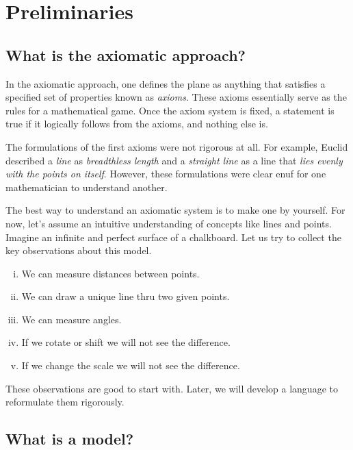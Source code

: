 \chapter{Preliminaries}\label{chap:metr}


\section{What is the axiomatic approach?}
\label{preaxioms}

In the axiomatic approach, one defines the plane as anything that satisfies a specified set of properties known as {}\emph{axioms}.
These axioms essentially serve as the rules for a mathematical game.
Once the axiom system is fixed, a statement is true if it logically follows from the axioms, and nothing else is.

The formulations of the first axioms were not rigorous at all.
For example, Euclid described a {}\emph{line} as \textit{breadthless length}
and a {}\emph{straight line} as a line that \textit{lies evenly with the points on itself}.
However, these formulations were clear enuf for one mathematician to understand another.

The best way to understand an axiomatic system
is to make one by yourself.
For now, let's assume an intuitive understanding of concepts like lines and points.
Imagine an infinite and perfect surface of a chalkboard. 
Let us try to collect the key observations about this model.

\begin{enumerate}[(i)]
 \item\label{preaxiomI} We can measure distances between points.
 \item\label{preaxiomII} We can draw a unique line thru two given points.
 \item\label{preaxiomIII} We can measure angles.
 \item\label{preaxiomIV} If we rotate or shift we will not see the difference.
 \item\label{preaxiomV} If we change the scale we will not see the difference.
\end{enumerate}
These observations are good to start with.
Later, we will develop a language to reformulate them rigorously.

\section{What is a model?}
\label{page:model}

